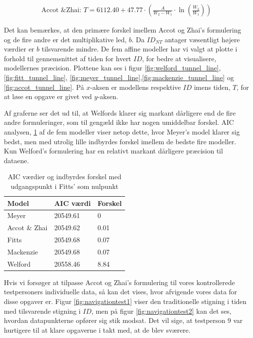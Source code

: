\begin{align*}
\text{Accot \& Zhai: } T = 6112.40+47.77 \cdot \left(\frac{A}{W_2-W_1}\cdot\ln\left(\frac{W_2}{W_1 }\right)\right)
\end{align*}

Det kan bemærkes, at den primære forskel imellem Accot og Zhai's formulering og de fire andre er det multiplikative led, $b$. Da $ID_{NT}$ antager væsentligt højere værdier er $b$ tilsvarende mindre. De fem affine modeller har vi valgt at plotte i forhold til gennemsnittet af tiden for hvert $ID$, for bedre at visualisere, modellernes præcision. Plottene kan ses i figur \ref{fig:welford_tunnel_line}, \ref{fig:fitt_tunnel_line}, \ref{fig:meyer_tunnel_line},\ref{fig:mackenzie_tunnel_line} og \ref{fig:accot_tunnel_line}. På $x$-aksen er modellens respektive $ID$ imens tiden, $T$, for at løse en opgave er givet ved $y$-aksen.

Af graferne ser det ud til, at Welfords klarer sig markant dårligere end de fire andre formuleringer, som til gengæld ikke har nogen umiddelbar forskel. AIC analysen, \ref{tab:table_analysis_aic_tunnel} af de fem modeller viser netop dette, hvor Meyer's model klarer sig bedst, men med utrolig lille indbyrdes forskel imellem de bedste fire modeller. Kun Welford's formulering har en relativt markant dårligere præcision til dataene.

\begin{table}[h]
\centering
\begin{tabular}{lll}
Model & AIC værdi & Forskel\\\hline
Meyer & 20549.61 & 0 \\
Accot \& Zhai & 20549.62 & 0.01\\
Fitts & 20549.68 & 0.07\\
Mackenzie & 20549.68 & 0.07 \\
Welford & 20558.46 & 8.84
\end{tabular}
\caption{AIC værdier og indbyrdes forskel med udgangspunkt i Fitts' som nulpunkt}
\label{tab:table_analysis_aic_tunnel}
\end{table}

Hvis vi forsøger at tilpasse Accot og Zhai's formulering til vores kontrollerede testpersoners individuelle data, så kan det vises, hvor afvigende vores data for disse opgaver er. Figur \ref{fig:navigationtest1} viser den traditionelle stigning i tiden med tilsvarende stigning i $ID$, men på figur \ref{fig:navigationtest2} kan det ses, hvordan datapunkterne opfører sig stik modsat. Det vil sige, at testperson 9 var hurtigere til at klare opgaverne i takt med, at de blev sværere.

